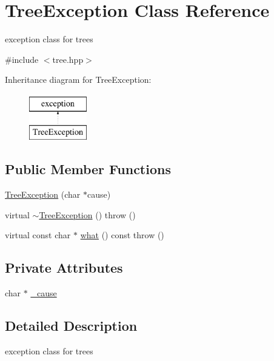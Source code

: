 \hypertarget{class_tree_exception}{\section{Tree\-Exception Class Reference}
\label{class_tree_exception}
}


exception class for trees  




{\ttfamily \#include $<$tree.\-hpp$>$}

Inheritance diagram for Tree\-Exception\-:\begin{figure}[H]
\begin{center}
\leavevmode
\includegraphics[height=2.000000cm]{class_tree_exception}
\end{center}
\end{figure}
\subsection*{Public Member Functions}
\begin{DoxyCompactItemize}
\item 
\hyperlink{class_tree_exception_aa75b34acf02d0e86fb70a63242894311}{Tree\-Exception} (char $\ast$cause)
\item 
virtual \hyperlink{class_tree_exception_a68dfe698f22aabd8d51b0c533f818263}{$\sim$\-Tree\-Exception} ()  throw ()
\item 
virtual const char $\ast$ \hyperlink{class_tree_exception_ab899a6ec0f82bf770b88ba4982e3d696}{what} () const   throw ()
\end{DoxyCompactItemize}
\subsection*{Private Attributes}
\begin{DoxyCompactItemize}
\item 
char $\ast$ \hyperlink{class_tree_exception_a90175b0c5a1e2a7ebb77cadc92b0388b}{\-\_\-cause}
\end{DoxyCompactItemize}


\subsection{Detailed Description}
exception class for trees 


